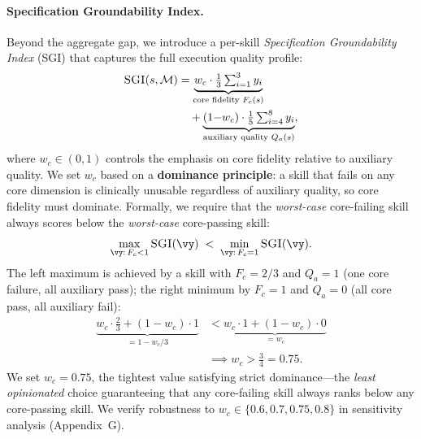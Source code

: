 \paragraph{Specification Groundability Index.}
Beyond the aggregate \rbu gap, we introduce a per-skill \emph{Specification Groundability Index} (\textsc{SGI}) that captures the full execution quality profile:
\begin{equation}
    \begin{aligned}
        \textsc{SGI}(s, \mathcal{M})
        &= \underbrace{w_c \cdot \tfrac{1}{3}\textstyle\sum_{i=1}^{3} y_i}_{\text{core fidelity } F_c(s)} \\
        &\quad + \underbrace{(1{-}w_c) \cdot \tfrac{1}{5}\textstyle\sum_{i=4}^{8} y_i}_{\text{auxiliary quality } Q_a(s)},
    \end{aligned}
    \label{eq:sgi}
\end{equation}
where $w_c \in (0,1)$ controls the emphasis on core fidelity relative to auxiliary quality.
We set $w_c$ based on a \textbf{dominance principle}: a skill that fails on any core dimension is clinically unusable regardless of auxiliary quality, so core fidelity must dominate.
Formally, we require that the \emph{worst-case} core-failing skill always scores below the \emph{worst-case} core-passing skill:
\begin{equation}
    \max_{\vy:\, F_c < 1} \textsc{SGI}(\vy) \;<\; \min_{\vy:\, F_c = 1} \textsc{SGI}(\vy).
    \label{eq:dominance}
\end{equation}
The left maximum is achieved by a skill with $F_c = 2/3$ and $Q_a = 1$ (one core failure, all auxiliary pass); the right minimum by $F_c = 1$ and $Q_a = 0$ (all core pass, all auxiliary fail):
\begin{equation}
    \begin{aligned}
        \underbrace{w_c \cdot \tfrac{2}{3} + (1{-}w_c) \cdot 1}_{= 1 - w_c/3}
        &< \underbrace{w_c \cdot 1 + (1{-}w_c) \cdot 0}_{= w_c} \\
        &\implies w_c > \tfrac{3}{4} = 0.75.
    \end{aligned}
    \label{eq:wc_derivation}
\end{equation}
We set $w_c = 0.75$, the tightest value satisfying strict dominance---the \emph{least opinionated} choice guaranteeing that any core-failing skill always ranks below any core-passing skill.
We verify robustness to $w_c \in \{0.6, 0.7, 0.75, 0.8\}$ in sensitivity analysis (Appendix~G).

